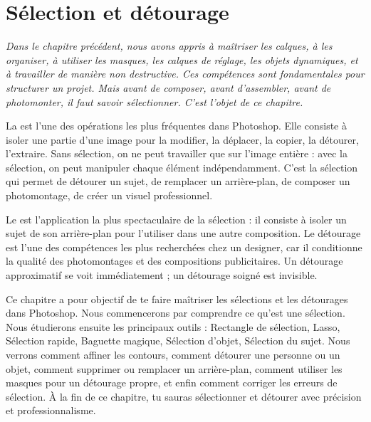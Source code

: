 
\chapter{Sélection et détourage}

\noindent
\textit{Dans le chapitre précédent, nous avons appris à maîtriser les calques, à les organiser, à utiliser les masques, les calques de réglage, les objets dynamiques, et à travailler de manière non destructive. Ces compétences sont fondamentales pour structurer un projet. Mais avant de composer, avant d'assembler, avant de photomonter, il faut savoir \emph{sélectionner}. C'est l'objet de ce chapitre.}

\vspace{1em}

\noindent
La  est l'une des opérations les plus fréquentes dans Photoshop. Elle consiste à isoler une partie d'une image pour la modifier, la déplacer, la copier, la détourer, l'extraire. Sans sélection, on ne peut travailler que sur l'image entière : avec la sélection, on peut manipuler chaque élément indépendamment. C'est la sélection qui permet de détourer un sujet, de remplacer un arrière-plan, de composer un photomontage, de créer un visuel professionnel.

\vspace{1em}

\noindent
Le  est l'application la plus spectaculaire de la sélection : il consiste à isoler un sujet de son arrière-plan pour l'utiliser dans une autre composition. Le détourage est l'une des compétences les plus recherchées chez un designer, car il conditionne la qualité des photomontages et des compositions publicitaires. Un détourage approximatif se voit immédiatement ; un détourage soigné est invisible.

\vspace{1em}

\noindent
Ce chapitre a pour objectif de te faire maîtriser les sélections et les détourages dans Photoshop. Nous commencerons par comprendre ce qu'est une sélection. Nous étudierons ensuite les principaux outils : Rectangle de sélection, Lasso, Sélection rapide, Baguette magique, Sélection d'objet, Sélection du sujet. Nous verrons comment affiner les contours, comment détourer une personne ou un objet, comment supprimer ou remplacer un arrière-plan, comment utiliser les masques pour un détourage propre, et enfin comment corriger les erreurs de sélection. À la fin de ce chapitre, tu sauras sélectionner et détourer avec précision et professionnalisme.

